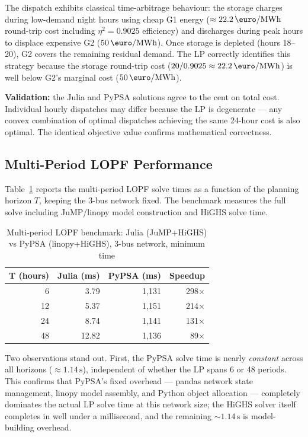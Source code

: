 The dispatch exhibits classical time-arbitrage behaviour: the storage charges during low-demand night hours using cheap G1 energy ($\approx 22.2\,\text{\euro/MWh}$ round-trip cost including $\eta^2 = 0.9025$ efficiency) and discharges during peak hours to displace expensive G2 ($50\,\text{\euro/MWh}$). Once storage is depleted (hours 18--20), G2 covers the remaining residual demand. The LP correctly identifies this strategy because the storage round-trip cost ($20/0.9025 \approx 22.2\,\text{\euro/MWh}$) is well below G2's marginal cost ($50\,\text{\euro/MWh}$).

\textbf{Validation:} the Julia and PyPSA solutions agree to the cent on total cost. Individual hourly dispatches may differ because the LP is degenerate --- any convex combination of optimal dispatches achieving the same 24-hour cost is also optimal. The identical objective value confirms mathematical correctness.

\subsection{Multi-Period LOPF Performance}

Table~\ref{tab:mp_benchmark} reports the multi-period LOPF solve times as a function of the planning horizon $T$, keeping the 3-bus network fixed. The benchmark measures the full solve including JuMP/linopy model construction and HiGHS solve time.

\begin{table}[H]
\centering
\caption{Multi-period LOPF benchmark: Julia (JuMP+HiGHS) vs PyPSA (linopy+HiGHS), 3-bus network, minimum time}
\label{tab:mp_benchmark}
\begin{tabular}{rrrr}
\toprule
\textbf{T (hours)} & \textbf{Julia (ms)} & \textbf{PyPSA (ms)} & \textbf{Speedup} \\
\midrule
  6 &  3.79 & 1{,}131 & 298$\times$ \\
 12 &  5.37 & 1{,}151 & 214$\times$ \\
 24 &  8.74 & 1{,}141 & 131$\times$ \\
 48 & 12.82 & 1{,}136 &  89$\times$ \\
\bottomrule
\end{tabular}
\end{table}

Two observations stand out. First, the PyPSA solve time is nearly \emph{constant} across all horizons ($\approx 1.14\,\text{s}$), independent of whether the LP spans 6 or 48 periods. This confirms that PyPSA's fixed overhead --- pandas network state management, linopy model assembly, and Python object allocation --- completely dominates the actual LP solve time at this network size; the HiGHS solver itself completes in well under a millisecond, and the remaining $\sim 1.14\,\text{s}$ is model-building overhead.

